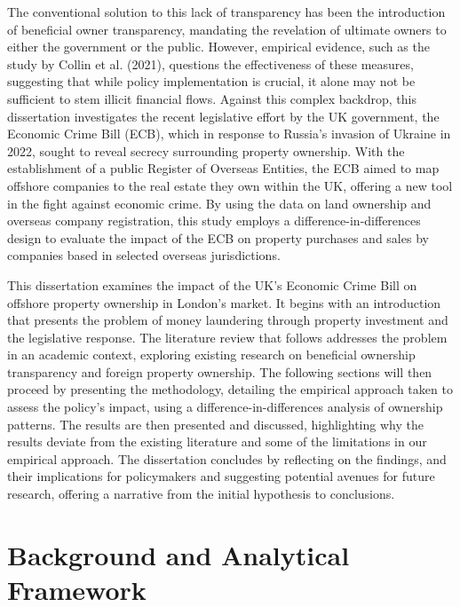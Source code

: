 \documentclass{article}
\begin{document}
The conventional solution to this lack of transparency has been the introduction of beneficial owner transparency, mandating the revelation of ultimate owners to either the government or the public. However, empirical evidence, such as the study by Collin et al. (2021), questions the effectiveness of these measures, suggesting that while policy implementation is crucial, it alone may not be sufficient to stem illicit financial flows. Against this complex backdrop, this dissertation investigates the recent legislative effort by the UK government, the Economic Crime Bill (ECB), which in response to Russia's invasion of Ukraine in 2022, sought to reveal secrecy surrounding property ownership. With the establishment of a public Register of Overseas Entities, the ECB aimed to map offshore companies to the real estate they own within the UK, offering a new tool in the fight against economic crime. By using the data on land ownership and overseas company registration, this study employs a difference-in-differences design to evaluate the impact of the ECB on property purchases and sales by companies based in selected overseas jurisdictions.

This dissertation examines the impact of the UK's Economic Crime Bill on offshore property ownership in London's market. It begins with an introduction that presents the problem of money laundering through property investment and the legislative response. The literature review that follows addresses the problem in an academic context, exploring existing research on beneficial ownership transparency and foreign property ownership. The following sections will then proceed by presenting the methodology, detailing the empirical approach taken to assess the policy's impact, using a difference-in-differences analysis of ownership patterns. The results are then presented and discussed, highlighting why the results deviate from the existing literature and some of the limitations in our empirical approach. The dissertation concludes by reflecting on the findings, and their implications for policymakers and suggesting potential avenues for future research, offering a narrative from the initial hypothesis to conclusions.


\section{Background and Analytical Framework}
\end{document}

